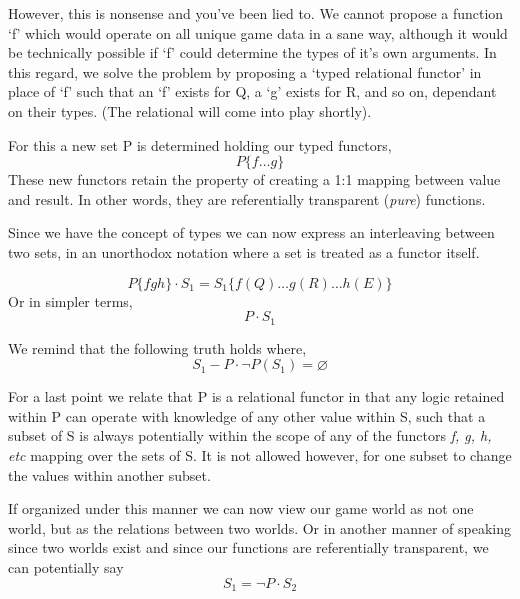 \documentclass[11pt,twocolumn]{article}
\begin{document}
However, this is nonsense and you've been lied to.  We cannot propose a function `f' which would operate on all unique game data in a sane way,  although it would be technically possible if `f' could determine the types of it's own arguments.  In this regard, we solve the problem by proposing a `typed relational functor' in place of `f' such that an `f' exists for Q, a `g' exists for R, and so on, dependant on their types.  (The relational will come into play shortly).

For this a new set P is determined holding our typed functors, \begin{displaymath}P \{ f \dots g \}\end{displaymath}  These new functors retain the property of creating a 1:1 mapping between value and result.  In other words,  they are referentially transparent (\textit{pure}) functions.

Since we have the concept of types we can now express an interleaving between two sets, in an unorthodox notation where a set is treated as a functor itself.

\begin{displaymath}
  P\{fgh\} \cdot S_1 = S_1\{ f(Q)\dots g(R)\dots h(E) \}
  \end{displaymath}
  Or in simpler terms,
  \begin{displaymath}
    P \cdot S_1
    \end{displaymath}

We remind that the following truth holds where,
\begin{displaymath}
  S_1 - P \cdot \neg P( S_1) = \varnothing
  \end{displaymath}

For a last point we relate that P is a relational functor in that any logic retained within P can operate with knowledge of any other value within S, such that a subset of S is always potentially within the scope of any of the functors \textit{f, g, h, etc} mapping over the sets of S.  It is not allowed however, for one subset to change the values within another subset.

If organized under this manner we can now view our game world as not one world, but as the relations between two worlds.  Or in another manner of speaking since two worlds exist and since our functions are referentially transparent, we can potentially say \begin{displaymath}S_1 = \neg P \cdot S_2\end{displaymath}
\end{document}
